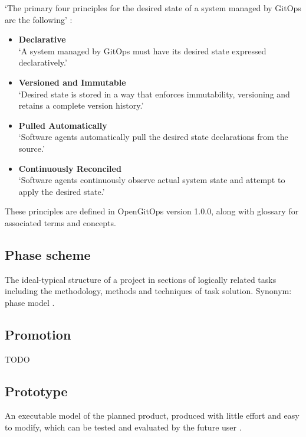 \noindent
\enquote*{The primary four principles
	for the desired state of a
	system managed by GitOps are the following} \autocite{gitopsPrinciplesv100}:

\begin{itemize}
	\item \textbf{Declarative} \\
	\enquote*{A system managed by GitOps must have its desired state expressed declaratively.}
	\item \textbf{Versioned and Immutable} \\
	\enquote*{Desired state is stored in a way that enforces immutability, versioning and retains a complete version history.}
	\item \textbf{Pulled Automatically} \\
	\enquote*{Software agents automatically pull the desired state declarations from the source.}
	\item \textbf{Continuously Reconciled} \\
	\enquote*{Software agents continuously observe actual system state and attempt to apply the desired state.}
	\autocite{gitopsPrinciplesv100}
\end{itemize}


These principles are defined in OpenGitOps version 1.0.0,
along with glossary
\autocite{gitopsGlossary}
for associated terms and concepts.

\subsection*{Phase scheme}
The ideal-typical structure of a project in sections of logically related tasks including the methodology,
methods and techniques of task solution. Synonym: phase model
\autocite{riedlManagementInformatik2019}.

\subsection*{Promotion}
TODO

\subsection*{Prototype}
An executable model of the planned product, produced with little effort and easy to modify,
which can be tested and evaluated by the future user
\autocite{riedlManagementInformatik2019}.

